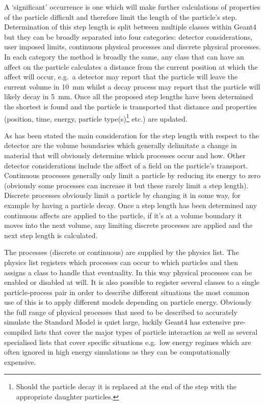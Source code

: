 A `significant' occurrence is one which will make further calculations of properties of the particle difficult and therefore limit the length of the particle's step. Determination of this step length is split between multiple classes within Geant4 but they can be broadly separated into four categories: detector considerations, user imposed limits, continuous physical processes and discrete physical processes. In each category the method is broadly the same, any class that can have an affect on the particle calculates a distance from the current position at which the affect will occur, e.g.\ a detector may report that the particle will leave the current volume in 10~mm whilst a decay process may report that the particle will likely decay in 5~mm. Once all the proposed step lengths have been determined the shortest is found and the particle is transported that distance and properties (position, time, energy, particle type(s)\footnote{Should the particle decay it is replaced at the end of the step with the appropriate daughter particles.} etc.) are updated. 

As has been stated the main consideration for the step length with respect to the detector are the volume boundaries which generally delimitate a change in material that will obviously determine which processes occur and how. Other detector considerations include the affect of a field on the particle's transport. Continuous processes generally only limit a particle by reducing its energy to zero (obviously some processes can increase it but these rarely limit a step length). Discrete processes obviously limit a particle by changing it in some way, for example by having a particle decay. Once a step length has been determined any continuous affects are applied to the particle, if it's at a volume boundary it moves into the next volume, any limiting discrete processes are applied and the next step length is calculated. 

The processes (discrete or continuous) are supplied by the physics list. The physics list registers which processes can occur to which particles and then assigns a class to handle that eventuality. In this way physical processes can be enabled or disabled at will. It is also possible to register several classes to a single particle-process pair in order to describe different situations the most common use of this is to apply different models depending on particle energy. Obviously the full range of physical processes that need to be described to accurately simulate the Standard Model is quiet large, luckily Geant4 has extensive pre-compiled lists that cover the major types of particle interaction as well as several specialised lists that cover specific situations e.g.\ low energy regimes which are often ignored in high energy simulations as they can be computationally expensive. 

